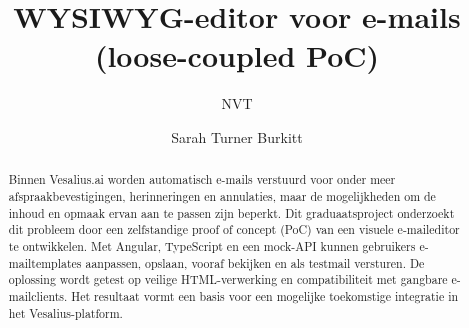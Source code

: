 \documentclass[a0,portrait]{hogent-poster}
\title{WYSIWYG-editor voor e-mails (loose-coupled PoC)}
\subtitle{NVT}
\author{Sarah Turner Burkitt}
\begin{document}
\maketitle

\begin{abstract}
  Binnen Vesalius.ai worden automatisch e-mails verstuurd voor onder meer
  afspraakbevestigingen, herinneringen en annulaties, maar de mogelijkheden
  om de inhoud en opmaak ervan aan te passen zijn beperkt. Dit graduaatsproject
  onderzoekt dit probleem door een zelfstandige proof of concept (PoC) van een
  visuele e-maileditor te ontwikkelen. Met Angular, TypeScript en een mock-API
  kunnen gebruikers e-mailtemplates aanpassen, opslaan, vooraf bekijken en als
  testmail versturen. De oplossing wordt getest op veilige HTML-verwerking en
  compatibiliteit met gangbare e-mailclients. Het resultaat vormt een basis
  voor een mogelijke toekomstige integratie in het Vesalius-platform.
\end{abstract}
\end{document}
